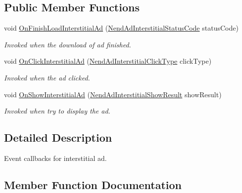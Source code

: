 \subsection*{Public Member Functions}
\begin{DoxyCompactItemize}
\item 
void \hyperlink{interface_nend_unity_plugin_1_1_callback_1_1_nend_ad_interstitial_callback_a37d77b7a940079d2f06d2a840f562d7b}{On\+Finish\+Load\+Interstitial\+Ad} (\hyperlink{namespace_nend_unity_plugin_1_1_callback_a439eb407799e3077fd18b7f3809f68d6}{Nend\+Ad\+Interstitial\+Status\+Code} status\+Code)
\begin{DoxyCompactList}\small\item\em Invoked when the download of ad finished. \end{DoxyCompactList}\item 
void \hyperlink{interface_nend_unity_plugin_1_1_callback_1_1_nend_ad_interstitial_callback_a64e4d69b1a9189811e0caef29c48df5d}{On\+Click\+Interstitial\+Ad} (\hyperlink{namespace_nend_unity_plugin_1_1_callback_a66432900696cae54e04798d6f3a3892d}{Nend\+Ad\+Interstitial\+Click\+Type} click\+Type)
\begin{DoxyCompactList}\small\item\em Invoked when the ad clicked. \end{DoxyCompactList}\item 
void \hyperlink{interface_nend_unity_plugin_1_1_callback_1_1_nend_ad_interstitial_callback_a1ae09ddf0fe783499f10c844a5858b2d}{On\+Show\+Interstitial\+Ad} (\hyperlink{namespace_nend_unity_plugin_1_1_callback_acda9f80521c8e1306a784491859fa2aa}{Nend\+Ad\+Interstitial\+Show\+Result} show\+Result)
\begin{DoxyCompactList}\small\item\em Invoked when try to display the ad. \end{DoxyCompactList}\end{DoxyCompactItemize}


\subsection{Detailed Description}
Event callbacks for interstitial ad. 



\subsection{Member Function Documentation}
\hypertarget{interface_nend_unity_plugin_1_1_callback_1_1_nend_ad_interstitial_callback_a64e4d69b1a9189811e0caef29c48df5d}{}
